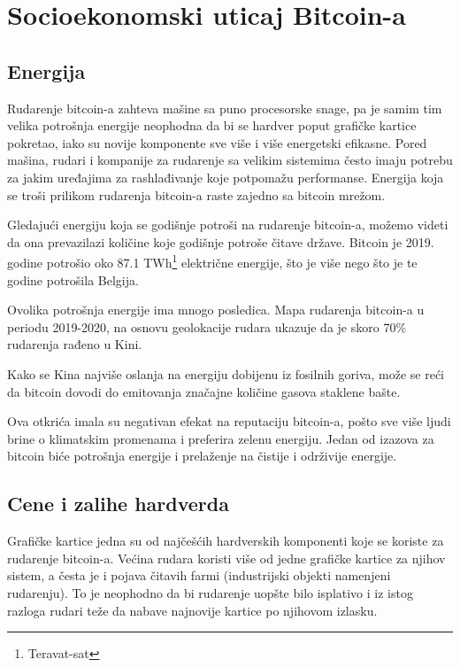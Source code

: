 \documentclass[a4paper]{article}
\begin{document}
{\clearpage
\section{Socioekonomski uticaj Bitcoin-a}

\subsection{Energija}

Rudarenje bitcoin-a zahteva mašine sa puno procesorske snage, pa je samim tim velika potrošnja energije neophodna da bi se hardver poput grafičke kartice pokretao, iako su novije komponente sve više i više energetski efikasne. Pored mašina, rudari i kompanije za rudarenje sa velikim sistemima često imaju potrebu za jakim uređajima za rashlađivanje koje potpomažu performanse. Energija koja se troši prilikom rudarenja bitcoin-a raste zajedno sa bitcoin mrežom.

Gledajući energiju koja se godišnje potroši na rudarenje bitcoin-a, možemo videti da ona prevazilazi količine koje godišnje potroše čitave države. Bitcoin je 2019. godine potrošio oko 87.1 TWh\footnote{Teravat-sat} električne energije, što je više nego što je te godine potrošila Belgija.  \cite{energijapotrosnja}


Ovolika potrošnja energije ima mnogo posledica. Mapa rudarenja bitcoin-a u periodu 2019-2020, na osnovu geolokacije rudara ukazuje da je skoro 70\% rudarenja rađeno u Kini. \cite{energijakina}

Kako se Kina najviše oslanja na energiju dobijenu iz fosilnih goriva, može se reći da bitcoin dovodi do emitovanja značajne količine gasova staklene bašte.

Ova otkrića imala su negativan efekat na reputaciju bitcoin-a, pošto sve više ljudi brine o klimatskim promenama i preferira zelenu energiju. Jedan od izazova za bitcoin biće potrošnja energije i prelaženje na čistije i održivije energije.


\subsection{Cene i zalihe hardverda }

Grafičke kartice jedna su od najčešćih hardverskih komponenti koje se koriste za rudarenje bitcoin-a. Većina rudara koristi više od jedne grafičke kartice za njihov sistem, a česta je i pojava čitavih farmi (industrijski objekti namenjeni rudarenju). To je neophodno da bi rudarenje uopšte bilo isplativo i iz istog razloga rudari teže da nabave najnovije kartice po njihovom izlasku.

}
\end{document}
